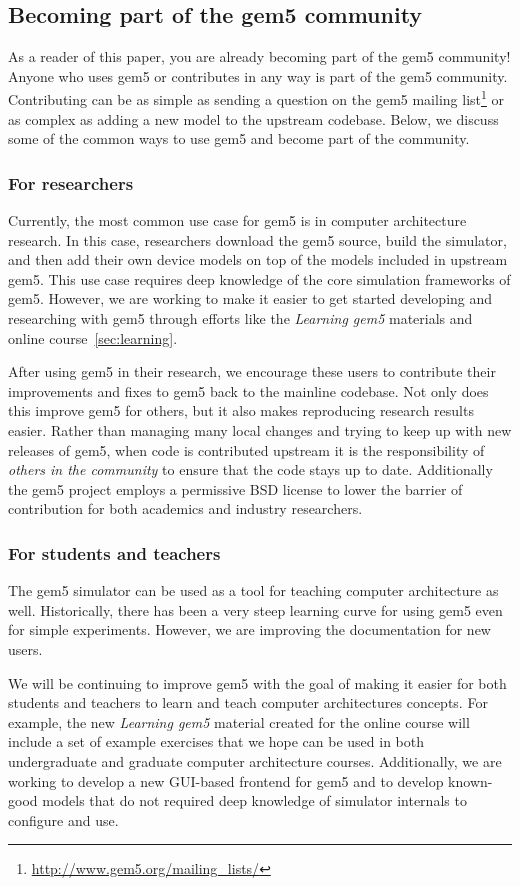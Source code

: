 \subsection{Becoming part of the gem5 community}

As a reader of this paper, you are already becoming part of the gem5 community!
Anyone who uses gem5 or contributes in any way is part of the gem5 community.
Contributing can be as simple as sending a question on the gem5 mailing list\footnote{\url{http://www.gem5.org/mailing_lists/}} or as complex as adding a new model to the upstream codebase.
Below, we discuss some of the common ways to use gem5 and become part of the community.

\subsubsection{For researchers}

Currently, the most common use case for gem5 is in computer architecture research.
In this case, researchers download the gem5 source, build the simulator, and then add their own device models on top of the models included in upstream gem5.
This use case requires deep knowledge of the core simulation frameworks of gem5.
However, we are working to make it easier to get started developing and researching with gem5 through efforts like the \emph{Learning gem5} materials and online course~\ref{sec:learning}.

After using gem5 in their research, we encourage these users to contribute their improvements and fixes to gem5 back to the mainline codebase.
Not only does this improve gem5 for others, but it also makes reproducing research results easier.
Rather than managing many local changes and trying to keep up with new releases of gem5, when code is contributed upstream it is the responsibility of \emph{others in the community} to ensure that the code stays up to date.
Additionally the gem5 project employs a permissive BSD license to lower the barrier of contribution for both academics and industry researchers.

\subsubsection{For students and teachers}

The gem5 simulator can be used as a tool for teaching computer architecture as well.
Historically, there has been a very steep learning curve for using gem5 even for simple experiments.
However, we are improving the documentation for new users.

We will be continuing to improve gem5 with the goal of making it easier for both students and teachers to learn and teach computer architectures concepts.
For example, the new \emph{Learning gem5} material created for the online course will include a set of example exercises that we hope can be used in both undergraduate and graduate computer architecture courses.
Additionally, we are working to develop a new GUI-based frontend for gem5 and to develop known-good models that do not required deep knowledge of simulator internals to configure and use.
